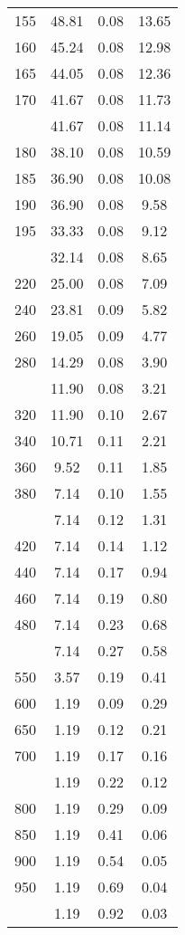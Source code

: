 \begin{table}[ht]
\begin{tabular}{lccc}
  155 & 48.81 & 0.08 & 13.65 \\ 
  160 & 45.24 & 0.08 & 12.98 \\ 
  165 & 44.05 & 0.08 & 12.36 \\ 
  170 & 41.67 & 0.08 & 11.73 \\ 
   \addlinespace
175 & 41.67 & 0.08 & 11.14 \\ 
  180 & 38.10 & 0.08 & 10.59 \\ 
  185 & 36.90 & 0.08 & 10.08 \\ 
  190 & 36.90 & 0.08 & 9.58 \\ 
  195 & 33.33 & 0.08 & 9.12 \\ 
   \addlinespace
200 & 32.14 & 0.08 & 8.65 \\ 
  220 & 25.00 & 0.08 & 7.09 \\ 
  240 & 23.81 & 0.09 & 5.82 \\ 
  260 & 19.05 & 0.09 & 4.77 \\ 
  280 & 14.29 & 0.08 & 3.90 \\ 
   \addlinespace
300 & 11.90 & 0.08 & 3.21 \\ 
  320 & 11.90 & 0.10 & 2.67 \\ 
  340 & 10.71 & 0.11 & 2.21 \\ 
  360 & 9.52 & 0.11 & 1.85 \\ 
  380 & 7.14 & 0.10 & 1.55 \\ 
   \addlinespace
400 & 7.14 & 0.12 & 1.31 \\ 
  420 & 7.14 & 0.14 & 1.12 \\ 
  440 & 7.14 & 0.17 & 0.94 \\ 
  460 & 7.14 & 0.19 & 0.80 \\ 
  480 & 7.14 & 0.23 & 0.68 \\ 
   \addlinespace
500 & 7.14 & 0.27 & 0.58 \\ 
  550 & 3.57 & 0.19 & 0.41 \\ 
  600 & 1.19 & 0.09 & 0.29 \\ 
  650 & 1.19 & 0.12 & 0.21 \\ 
  700 & 1.19 & 0.17 & 0.16 \\ 
   \addlinespace
750 & 1.19 & 0.22 & 0.12 \\ 
  800 & 1.19 & 0.29 & 0.09 \\ 
  850 & 1.19 & 0.41 & 0.06 \\ 
  900 & 1.19 & 0.54 & 0.05 \\ 
  950 & 1.19 & 0.69 & 0.04 \\ 
   \addlinespace
1000 & 1.19 & 0.92 & 0.03 \\ 
   \bottomrule
\end{tabular}
\end{table}
